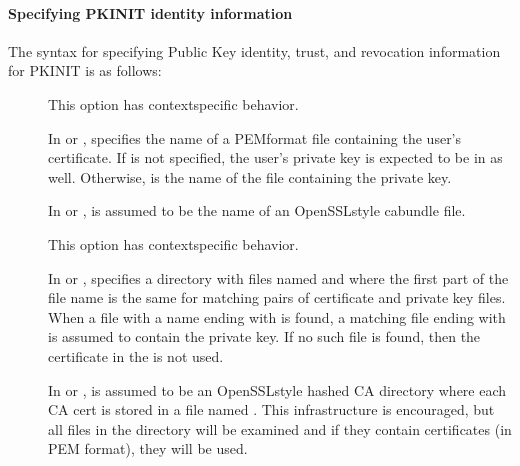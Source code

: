 \documentclass[letterpaper,10pt,english]{sphinxmanual}
\begin{document}
\paragraph{Specifying PKINIT identity information}
\label{\detokenize{admin/conf_files/krb5_conf:specifying-pkinit-identity-information}}\label{\detokenize{admin/conf_files/krb5_conf:pkinit-identity}}
\sphinxAtStartPar
The syntax for specifying Public Key identity, trust, and revocation
information for PKINIT is as follows:
\begin{description}
\item[{\sphinxstyleemphasis{filename}{[}\sphinxstylestrong{,}\sphinxstyleemphasis{keyfilename}{]}}] \leavevmode
\sphinxAtStartPar
This option has context\sphinxhyphen{}specific behavior.

\sphinxAtStartPar
In  or , 
specifies the name of a PEM\sphinxhyphen{}format file containing the user’s
certificate.  If  is not specified, the user’s
private key is expected to be in  as well.  Otherwise,
 is the name of the file containing the private key.

\sphinxAtStartPar
In  or ,  is assumed to
be the name of an OpenSSL\sphinxhyphen{}style ca\sphinxhyphen{}bundle file.

\item[{}] \leavevmode
\sphinxAtStartPar
This option has context\sphinxhyphen{}specific behavior.

\sphinxAtStartPar
In  or , 
specifies a directory with files named  and 
where the first part of the file name is the same for matching
pairs of certificate and private key files.  When a file with a
name ending with  is found, a matching file ending with
 is assumed to contain the private key.  If no such file
is found, then the certificate in the  is not used.

\sphinxAtStartPar
In  or ,  is assumed to
be an OpenSSL\sphinxhyphen{}style hashed CA directory where each CA cert is
stored in a file named .  This infrastructure
is encouraged, but all files in the directory will be examined and
if they contain certificates (in PEM format), they will be used.


\end{description}
\end{document}
